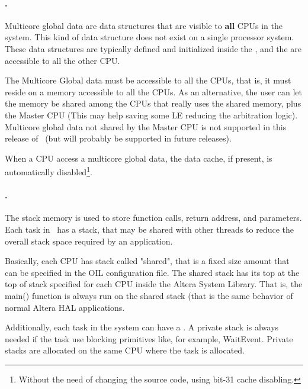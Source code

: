 \paragraph{.}


Multicore global data are data structures that are visible to {\bf
all} CPUs in the system. This kind of data structure does not exist on
a single processor system. These data structures are typically defined
and initialized inside the , and the are accessible
to all the other CPU.

The Multicore Global data must be accessible to all the CPUs, that is,
it must reside on a memory accessible to all the CPUs. As an
alternative, the user can let the memory be shared among the CPUs that
really uses the shared memory, plus the Master CPU (This may help
saving some LE reducing the arbitration logic). Multicore global data
not shared by the Master CPU is not supported in this release of \ee\
(but will probably be supported in future releases).

When a CPU access a multicore global data, the data cache, if present,
is automatically disabled\footnote{Without the need of changing the
source code, using bit-31 cache disabling.}.

\paragraph{.}

The stack memory is used to store function calls, return address, and
parameters. Each task in \ee\ has a stack, that may be shared with
other threads to reduce the overall stack space required by an
application.

Basically, each CPU has stack called "shared",
that is a fixed size amount that can be specified in the OIL
configuration file. The shared stack has its top at the top of stack
specified for each CPU inside the Altera System Library. That is, the
main() function is always run on the shared stack (that is the same
behavior of normal Altera HAL applications.

Additionally, each task in the system can have a . A private stack is always needed if the task use blocking
primitives like, for example, WaitEvent. Private stacks are allocated
on the same CPU where the task is allocated.






